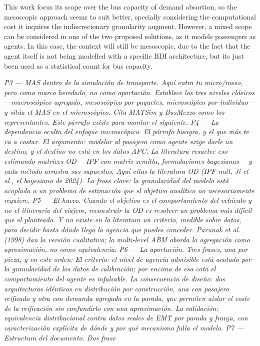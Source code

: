 \documentclass[a4paper,fleqn]{cas-sc}
\begin{document}
This work focus its scope over the bus capacity of demand absortion, so the mesoscopic approach seems to
suit better, specially considering the computational cost it inquires the indiscrecionary granularity augment.
However, a mixed scope can be considered in one of the two proposed solutions, as it models passengers
as agents. In this case, the context will still be mesoscopic, due to the fact that the agent itself is not
being modelled with a specific BDI architecture, but its just been used as a statistical count for bus
capacity.




\textit{P3 — MAS dentro de la simulación de transporte. Aquí entra tu micro/meso, pero como marco heredado,
 no como aportación. Establece los tres niveles clásicos —macroscópico agregado, mesoscópico por paquetes, 
 microscópico por individuo— y sitúa el MAS en el microscópico. Cita MATSim y BusMezzo como los 
 representantes. Este párrafo existe para montar el siguiente.
P4 — La dependencia oculta del enfoque microscópico. El párrafo bisagra, y el que más te va a costar. 
El argumento: modelar al pasajero como agente exige darle un destino, y el destino no está en los datos APC. 
La literatura resuelve eso estimando matrices OD —IPF con matriz semilla, formulaciones bayesianas— y cada 
método arrastra sus supuestos. Aquí citas la literatura OD (IPF-null, Ji et al., el bayesiano de 2024). La 
frase clave: la granularidad del modelo está acoplada a un problema de estimación que el objetivo analítico
 no necesariamente requiere.
P5 — El hueco. Cuando el objetivo es el comportamiento del vehículo y no el itinerario del viajero, 
reconstruir
 la OD es resolver un problema más difícil que el planteado. Y no existe en la literatura un criterio, 
 medible sobre datos, para decidir hasta dónde llega la agencia que puedes conceder. Parunak et al.
  (1998) dan la versión cualitativa; la multi-level ABM aborda la agregación como aproximación, no como 
  equivalencia.
P6 — La aportación. Tres frases, una por pieza, y en este orden:
El criterio: el nivel de agencia admisible está acotado por la granularidad de los datos de calibración; 
por encima de esa cota el comportamiento del agente es infalsable.
La consecuencia de diseño: dos arquitecturas idénticas en distribución por construcción, una con pasajero 
reificado y otra con demanda agregada en la parada, que permiten aislar el coste de la reificación sin 
confundirlo con una aproximación.
La validación: equivalencia distribucional contra datos reales de EMT por parada y franja, con 
caracterización explícita de dónde y por qué mecanismo falla el modelo.
P7 — Estructura del documento. Dos frase}
\end{document}
